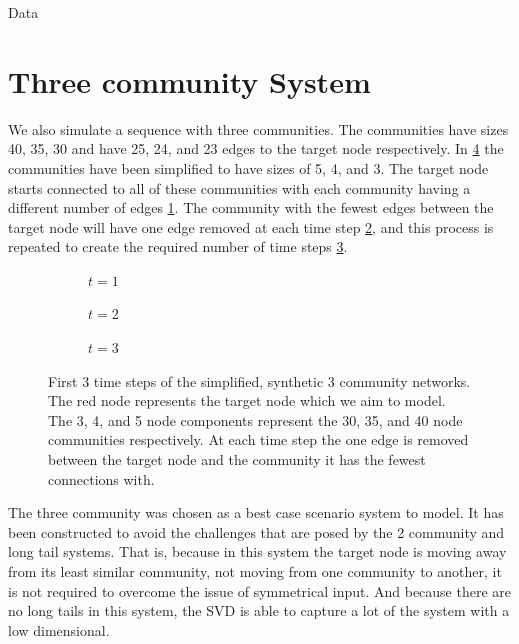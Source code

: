 \documentclass[12pt]{amsbook}
\begin{document}
\begin{chapter}{Data}
    \section{Three community System}
    We also simulate a sequence with three communities. The communities have sizes 40, 35, 30 and have 25, 24, and 23 edges to the target node respectively. In \cref{3community train series} the communities have been simplified to have sizes of 5, 4, and 3. The target node starts connected to all of these communities with each community having a different number of edges \cref{3community train series a}. The community with the fewest edges between the target node will have one edge removed at each time step \cref{3community train series b}, and this process is repeated to create the required number of time steps \cref{3community train series c}.  
    \begin{figure}[H]
        \centering
        \centering
        \begin{subfigure}[c]{0.3\textwidth}
            \centering
            \resizebox{.6\width}{!}{}
            \caption{$t=1$}
            \label{3community train series a}
        \end{subfigure}
        \hfill
        \centering
        \begin{subfigure}[c]{0.3\textwidth}
            \centering
            \resizebox{.6\width}{!}{}
            \caption{$t=2$}
            \label{3community train series b}            
        \end{subfigure}
        \hfill
        \centering
        \begin{subfigure}[c]{0.3\textwidth}
            \centering
            \resizebox{.6\width}{!}{}
            \caption{$t=3$}
            \label{3community train series c}
        \end{subfigure}
        \caption{First 3 time steps of the simplified, synthetic 3 community networks. The red node represents the target node which we aim to model. The 3, 4, and 5 node components represent the 30, 35, and 40 node communities respectively. At each time step the one edge is removed between the target node and the community it has the fewest connections with.}
        \label{3community train series}
    \end{figure}
     
    The three community was chosen as a best case scenario system to model. It has been constructed to avoid the challenges that are posed by the 2 community and long tail systems. That is, because in this system the target node is moving away from its least similar community, not moving from one community to another, it is not required to overcome the issue of symmetrical input. And because there are no long tails in this system, the SVD is able to capture a lot of the system with a low dimensional.

\end{chapter}
\end{document}

